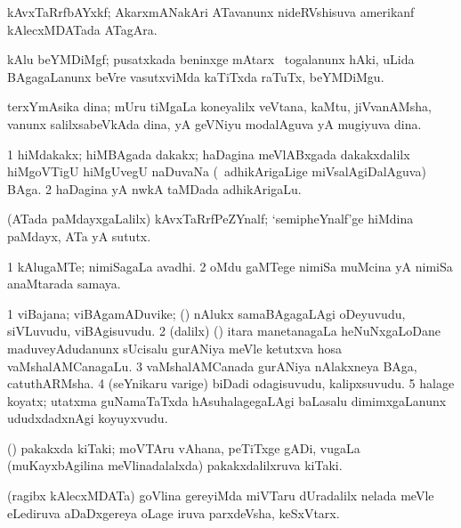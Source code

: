 \bentry
{}
\gl{\nA}
\bmng
kAvxTaRrfbAYxkf; AkarxmANakAri ATavanunx nideRVshisuva amerikanf kAlecxMDATada ATagAra. 
\emng
\eentry

\bentry
{}
\gl{\nA}
\bmng
kAlu beYMDiMgf; pusatxkada beninxge mAtarx \sA\ togalanunx hAki, uLida BAgagaLanunx beVre vasutxviMda kaTiTxda raTuTx, beYMDiMgu. 
\emng
\eentry

\bentry
{}
\gl{\nA}
\bmng
terxYmAsika dina; mUru tiMgaLa koneyalilx veVtana, kaMtu, jiVvanAMsha, \mo vanunx salilxsabeVkAda dina, yA geVNiyu modalAguva yA mugiyuva dina. 
\emng
\eentry

\bentry
{}
\gl{\nA}
\bmng
\bnum
\num{1} hiMdakakx; hiMBAgada dakakx; haDagina meVlABxgada dakakxdalilx hiMgoVTigU hiMgUvegU naDuvaNa (\sA\ adhikArigaLige miVsalAgiDalAguva) BAga. 
\num{2} haDagina yA nwkA taMDada adhikArigaLu. 
\enum
\emng
\eentry

\bentry
{}
\gl{\nA}
\bmng
(ATada paMdayxgaLalilx) kAvxTaRrfPeZYnalf; `semipheYnalf'ge hiMdina paMdayx, ATa yA sututx. 
\emng
\eentry

\bentry
{}
\gl{\nA}
\bmng
\bnum
\num{1} kAlugaMTe;  nimiSagaLa avadhi. 
\num{2} oMdu gaMTege  nimiSa muMcina yA  nimiSa anaMtarada samaya. 
\enum
\emng
\eentry

\bentry
{}
\gl{\nA}
\bmng
\bnum
\num{1} viBajana; viBAgamADuvike; (\kanmu) nAlukx sama\-BAgagaLAgi oDeyuvudu, siVLuvudu, viBAgisuvudu. 
\num{2} (\bava dalilx) (\vaMlAM) itara manetanagaLa heNuNxgaLoDane maduveyAdudanunx sUcisalu gurANiya meVle ketutxva hosa vaMshalAMCanagaLu. 
\num{3} vaMshalAMCanada gurANiya nAlakxneya BAga, catuthARMsha. 
\num{4} (seYnikaru \mo varige) biDadi odagisuvudu, kalipxsuvudu. 
\num{5} halage koyatx; utatxma guNamaTaTxda hAsuhalagegaLAgi baLasalu dimimxgaLanunx ududxdadxnAgi koyuyxvudu. 
\enum
\emng
\eentry

\bentry
{}
\gl{\nA}
\bmng
(\birx) pakakxda kiTaki; moVTAru vAhana, peTiTxge gADi, \mo vugaLa (muKayxbAgilina meVlinadalalxda) pakakxdalilxruva kiTaki. 
\emng
\eentry

\bentry
{}
\gl{\nA}
\bmng
(ragibx kAlecxMDATa) goVlina gereyiMda  miVTaru dUradalilx nelada meVle eLediruva aDaDxgereya oLage iruva parxdeVsha, keSxVtarx. 
\emng
\eentry

